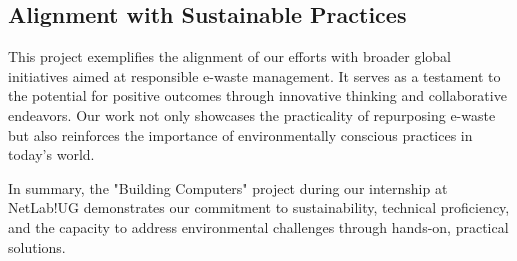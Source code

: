 \subsection{Alignment with Sustainable Practices}

This project exemplifies the alignment of our efforts with broader global initiatives aimed at responsible e-waste management. It serves as a testament to the potential for positive outcomes through innovative thinking and collaborative endeavors. Our work not only showcases the practicality of repurposing e-waste but also reinforces the importance of environmentally conscious practices in today's world.

In summary, the "Building Computers" project during our internship at NetLab!UG demonstrates our commitment to sustainability, technical proficiency, and the capacity to address environmental challenges through hands-on, practical solutions.
